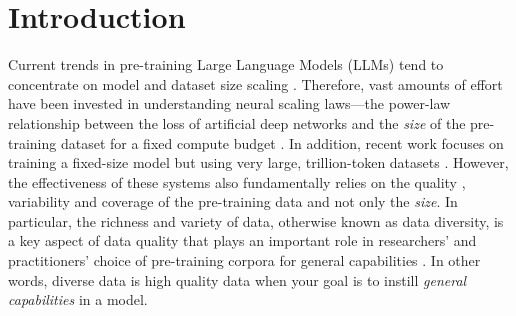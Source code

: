 \section{Introduction}

\label{introduction}
Current trends in pre-training Large Language Models (LLMs) tend to concentrate on model and dataset size scaling \citep{chowdhery2022palm, nostalgebraist2022chinchilla, gpt4, google2023palm2}.
Therefore, vast amounts of effort have been invested in understanding neural scaling laws---the power-law relationship between the loss of artificial deep networks and the \textit{size} of the pre-training dataset for a fixed compute budget \citep{hestness2017deep,rosenfeld2019constructive,henighan2020scaling,kaplan2020scaling,gordon2021data,hernandez2021scaling,jones2021scaling,zhai2022scaling,hoffmann2022training, clark2022unified, neumann2022scaling}.
In addition, recent work focuses on training a fixed-size model but using very large, trillion-token datasets \citep{llama, llamav2}.
However, the effectiveness of these systems also fundamentally relies on the quality \citep{longpre2023pretrainer}, variability and coverage of the pre-training data \citep{tatsu, david2010impossibility} and not only the \textit{size}. 
In particular, the richness and variety of data, otherwise known as data diversity, is a key aspect of data quality that plays an important role in researchers' and practitioners' choice of pre-training corpora for general capabilities \citep{thepile, gpt3, llama, eldan2023tinystories, gunasekar2023textbooks}. 
In other words, diverse data is high quality data when your goal is to instill \textit{general capabilities} in a model. 




